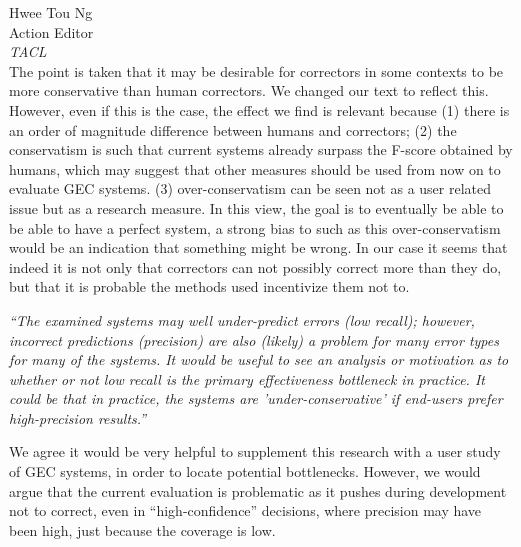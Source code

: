 \documentclass[11pt,letterpaper]{letter}
\begin{document}
\begin{letter}{%
Hwee Tou Ng\\
Action Editor\\
{\em TACL}\\
}
The point is taken that it may be desirable for correctors in some contexts to be more conservative than human correctors. We changed our text to reflect this. However, even if this is the case, the effect we find is relevant because (1) there is an order of magnitude difference between humans and correctors; (2) the conservatism is such that current systems already surpass the F-score obtained by humans, which may suggest that other measures should be used from now on to evaluate GEC systems. {\color{red}(3) over-conservatism can be seen not as a user related issue but as a research measure. In this view, the goal is to eventually be able to be able to have a perfect system, a strong bias to such as this over-conservatism would be an indication that something might be wrong. In our case it seems that indeed it is not only that correctors can not possibly correct more than they do, but that it is probable the methods used incentivize them not to.}


\emph{``The examined systems may well under-predict errors (low recall); however,
	incorrect predictions (precision) are also (likely) a problem for many error
	types for many of the systems. It would be useful to see an analysis or
	motivation as to whether or not low recall is the primary effectiveness
	bottleneck in practice. It could be that in practice, the systems are
	'under-conservative' if end-users prefer high-precision results.''
	}

We agree it would be very helpful to supplement this research with a user study of GEC systems, in order to locate potential bottlenecks. However, we would argue that the current evaluation is problematic as it pushes during development not to correct, even in ``high-confidence'' decisions, where precision may have been high, just because the coverage is low. 


\end{letter}
\end{document}
